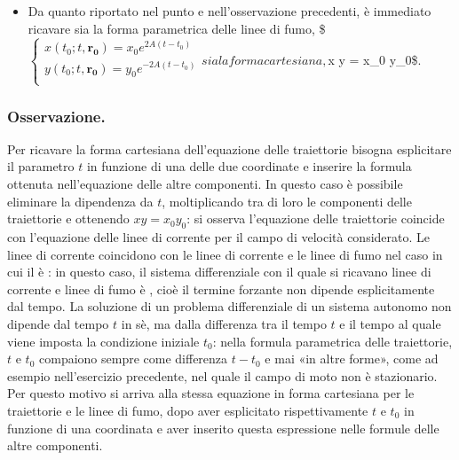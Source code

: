 \documentclass[letterpaper,10pt,italian]{jupyterBook}
\begin{document}
\begin{itemize}
\item {} 
\sphinxAtStartPar
{} Da quanto riportato nel punto e nell’osservazione
precedenti, è immediato ricavare sia la forma parametrica delle
linee di fumo, \$\(\begin{cases}
  x(t_0;t,\bm{r_0}) = x_0 e^{2A(t-t_0)} \\
  y(t_0;t,\bm{r_0}) = y_0 e^{-2A(t-t_0)} \\
 \end{cases}\)\( sia la forma cartesiana, \)x y = x\_0 y\_0\$.

\end{itemize}


\subsubsection{Osservazione.}
\label{\detokenize{polimi/fluidmechanics-ita/template/capitoli/03_cinematica/1201in:osservazione}}
\sphinxAtStartPar
Per ricavare la forma cartesiana dell’equazione delle traiettorie
bisogna esplicitare il parametro \(t\) in funzione di una delle due
coordinate e inserire la formula ottenuta nell’equazione delle altre
componenti. In questo caso è possibile eliminare la dipendenza da
\(t\), moltiplicando tra di loro le componenti delle traiettorie e
ottenendo \(x y = x_0 y_0\): si osserva l’equazione delle traiettorie
coincide con l’equazione delle linee di corrente per il campo di
velocità considerato. Le linee di corrente coincidono con le linee
di corrente e le linee di fumo nel caso in cui il  è : in questo caso, il sistema
differenziale con il quale si ricavano linee di corrente e linee di
fumo è , cioè il termine forzante non dipende
esplicitamente dal tempo. La soluzione di un problema differenziale
di un sistema autonomo non dipende dal tempo \(t\) in sè, ma dalla
differenza tra il tempo \(t\) e il tempo al quale viene imposta la
condizione iniziale \(t_0\): nella formula parametrica delle
traiettorie, \(t\) e \(t_0\) compaiono sempre come differenza \(t-t_0\) e
mai «in altre forme», come ad esempio nell’esercizio precedente, nel
quale il campo di moto non è stazionario. Per questo motivo si
arriva alla stessa equazione in forma cartesiana per le traiettorie
e le linee di fumo, dopo aver esplicitato rispettivamente \(t\) e
\(t_0\) in funzione di una coordinata e aver inserito questa
espressione nelle formule delle altre componenti.

\sphinxstepscope
\end{document}
